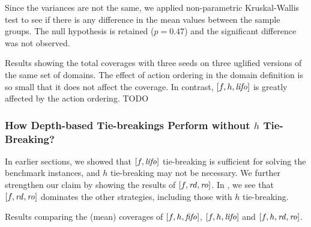 Since the variances are not the same, we applied 
non-parametric Kruskal-Wallis test to see if
there is any difference in the mean values between the sample groups.
The null hypothesis is retained ($p=0.47$) and the significant
difference was not observed.


\begin{table}[tb]
 \centering {}
 
 \caption{Results showing the total coverages with
 three seeds on three uglified versions of the same set of domains. The effect
 of action ordering in the domain definition is so small that it does not
 affect the coverage. In contrast, $[f,h,\mbox{\textit{lifo}}]$ is greatly affected by
 the action ordering. TODO}
 \label{actionordering-robustness}
\end{table}



\subsubsection{How Depth-based Tie-breakings Perform without $h$ Tie-Breaking?}

In earlier sections, we showed that $[f,\mbox{\textit{lifo}}]$ tie-breaking is
sufficient for solving the benchmark instances, and $h$ tie-breaking may
not be necessary. We further strengthen our claim by showing the results
of $[f,\mbox{\textit{rd}},\mbox{\textit{ro}}]$. In , we see that $[f,\mbox{\textit{rd}},\mbox{\textit{ro}}]$
dominates the other strategies, including those with $h$ tie-breaking.

\begin{table}[tb]
 \centering {}
 
 \caption{Results comparing the (mean) coverages of $[f,h,\mbox{\textit{fifo}}]$,
 $[f,h,\mbox{\textit{lifo}}]$ and $[f,h,\mbox{\textit{rd}},\mbox{\textit{ro}}]$.} \label{rd-without-h}
\end{table}

